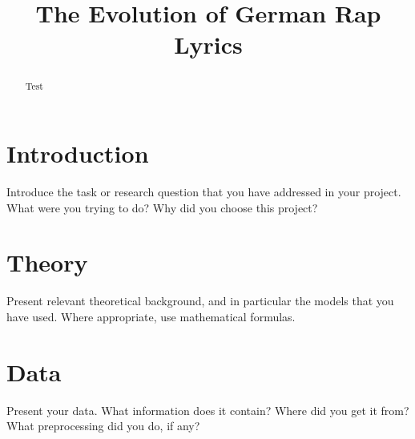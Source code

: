 \documentclass[conference]{IEEEtran}
\begin{document}
\title{The Evolution of German Rap Lyrics}


\author{
}

\maketitle

\begin{abstract}
Test
\end{abstract}

\section{Introduction}
Introduce the task or research question that you have addressed in
your project. What were you trying to do? Why did you choose this project?

\section{Theory}
Present relevant theoretical background, and in particular the models that
you have used. Where appropriate, use mathematical formulas.

\section{Data}
Present your data. What information does it contain? Where did you get it
from? What preprocessing did you do, if any?
\end{document}
